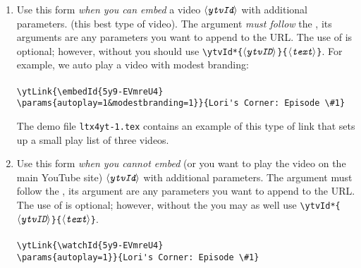 \documentclass{article}
\def\ameta#1{$\langle\textit{\texttt{#1}}\rangle$}
\newcommand{\YT}{\textsf{YouTube}}
\begin{document}
\begin{enumerate}
  \item[\ding{182}] Use this form \emph{when you can embed} a video
      \ameta{ytvId} with additional parameters. (this best type of video).
      The  argument \emph{must follow} the , its
      arguments are any parameters you want to append to the URL. The use
      of  is optional; however, without  you
      should use \verb|\ytvId*{|\ameta{ytvID}\verb|}{|\ameta{text}\verb|}|.
      For example, we auto play a video with modest branding:\\[3pt]
     \\\small
     \verb!\ytLink{\embedId{5y9-EVmreU4}!\\
     \null\qquad\verb!\params{autoplay=1&modestbranding=1}}{Lori's Corner: Episode \#1}!

     The demo file \texttt{ltx4yt-1.tex} contains an example of this type
     of link that sets up a small play list of three videos.

  \item[\ding{183}]  Use this form \emph{when you \emph{cannot} embed} (or
      you want to play the video on the main {\YT} site) \ameta{ytvId} with
      additional parameters. The  argument must follow the
      , its argument are any parameters you want to append to
      the URL. The use of  is optional; however, without the
       you may as well use
      \verb|\ytvId*{|\ameta{ytvID}\verb|}{|\ameta{text}\verb|}|.
    \\[3pt]
    \\
    \verb!\ytLink{\watchId{5y9-EVmreU4}!\\
    \null\qquad\verb!\params{autoplay=1}}{Lori's Corner: Episode \#1}!


\end{enumerate}
\end{document}
